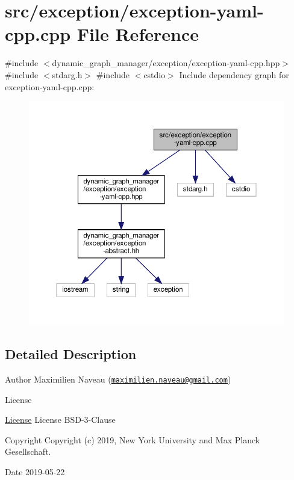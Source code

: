 \hypertarget{exception-yaml-cpp_8cpp}{}\section{src/exception/exception-\/yaml-\/cpp.cpp File Reference}
\label{exception-yaml-cpp_8cpp}
{\ttfamily \#include $<$dynamic\+\_\+graph\+\_\+manager/exception/exception-\/yaml-\/cpp.\+hpp$>$}\newline
{\ttfamily \#include $<$stdarg.\+h$>$}\newline
{\ttfamily \#include $<$cstdio$>$}\newline
Include dependency graph for exception-\/yaml-\/cpp.cpp\+:
\nopagebreak
\begin{figure}[H]
\begin{center}
\leavevmode
\includegraphics[width=350pt]{exception-yaml-cpp_8cpp__incl}
\end{center}
\end{figure}


\subsection{Detailed Description}
\begin{DoxyAuthor}{Author}
Maximilien Naveau (\href{mailto:maximilien.naveau@gmail.com}{\tt maximilien.\+naveau@gmail.\+com}) 
\end{DoxyAuthor}
\begin{DoxyRefDesc}{License}
\item[\hyperlink{license__license000051}{License}]License B\+S\+D-\/3-\/\+Clause \end{DoxyRefDesc}
\begin{DoxyCopyright}{Copyright}
Copyright (c) 2019, New York University and Max Planck Gesellschaft. 
\end{DoxyCopyright}
\begin{DoxyDate}{Date}
2019-\/05-\/22 
\end{DoxyDate}
